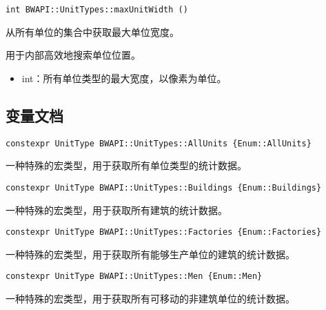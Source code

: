 \begin{tcolorbox}[colback=white, colframe=black!60!white, title=maxUnitWidth(), arc=0mm]
\begin{verbatim}
int BWAPI::UnitTypes::maxUnitWidth ()
\end{verbatim}
从所有单位的集合中获取最大单位宽度。\par 用于内部高效地搜索单位位置。
\begin{return}
\begin{itemize}
    \item int：所有单位类型的最大宽度，以像素为单位。
\end{itemize}
\end{return}
\end{tcolorbox}


\subsection{变量文档}
\begin{tcolorbox}[colback=white, colframe=black!60!white, title=AllUnits(), arc=0mm]
\begin{verbatim}
constexpr UnitType BWAPI::UnitTypes::AllUnits {Enum::AllUnits}
\end{verbatim}
一种特殊的宏类型，用于获取所有单位类型的统计数据。
\end{tcolorbox}

\begin{tcolorbox}[colback=white, colframe=black!60!white, title=Buildings(), arc=0mm]
\begin{verbatim}
constexpr UnitType BWAPI::UnitTypes::Buildings {Enum::Buildings}
\end{verbatim}
一种特殊的宏类型，用于获取所有建筑的统计数据。
\end{tcolorbox}

\begin{tcolorbox}[colback=white, colframe=black!60!white, title=Factories(), arc=0mm]
\begin{verbatim}
constexpr UnitType BWAPI::UnitTypes::Factories {Enum::Factories}
\end{verbatim}
一种特殊的宏类型，用于获取所有能够生产单位的建筑的统计数据。
\end{tcolorbox}

\begin{tcolorbox}[colback=white, colframe=black!60!white, title=Men(), arc=0mm]
\begin{verbatim}
constexpr UnitType BWAPI::UnitTypes::Men {Enum::Men}
\end{verbatim}
一种特殊的宏类型，用于获取所有可移动的非建筑单位的统计数据。
\end{tcolorbox}

